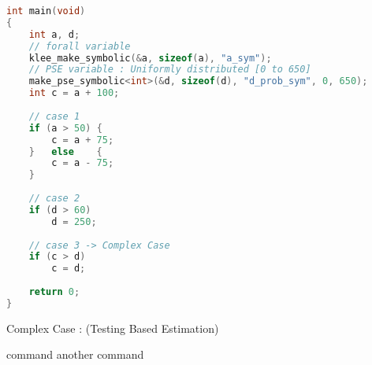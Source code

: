 \documentclass{article}
\begin{document}
\begin{lstlisting}[language=C++, caption={C++ code using listings}]
int main(void)
{
	int a, d;
	// forall variable
	klee_make_symbolic(&a, sizeof(a), "a_sym");
	// PSE variable : Uniformly distributed [0 to 650]
	make_pse_symbolic<int>(&d, sizeof(d), "d_prob_sym", 0, 650);
	int c = a + 100;
	
	// case 1
	if (a > 50)	{
		c = a + 75;
	}	else	{
		c = a - 75;
	}
	
	// case 2
	if (d > 60)
		d = 250;
	
	// case 3 -> Complex Case
	if (c > d)
		c = d;
	
	return 0;
}
\end{lstlisting}
\begin{algorithm}
    \caption{Complex Case : (Testing Based Estimation)}
    \begin{algorithmic}[1]
        \State command 
        \State another command 
        \EndForEach
    \end{algorithmic}
\end{algorithm}
\end{document}
